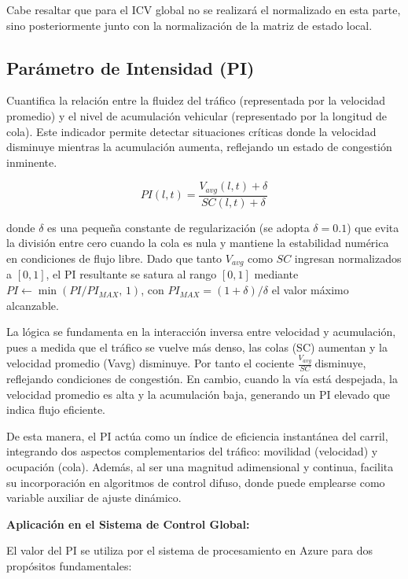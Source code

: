 \documentclass[12pt,a4paper,oneside]{report}
\begin{document}
Cabe resaltar que para el ICV global no se realizará el normalizado en esta parte, sino posteriormente junto con la normalización de la matriz de estado local.

\subsection{Parámetro de Intensidad (PI)}\label{paruxe1metro-de-intensidad-pi}

Cuantifica la relación entre la fluidez del tráfico (representada por la velocidad promedio) y el nivel de acumulación vehicular (representado por la longitud de cola). Este indicador permite detectar situaciones críticas donde la velocidad disminuye mientras la acumulación aumenta, reflejando un estado de congestión inminente.

\begin{equation}
PI(l,t) = \frac{V_{avg}(l,t) + \delta}{SC(l,t) + \delta}
\label{eq:pi}
\end{equation}

donde \(\delta\) es una pequeña constante de regularización (se adopta \(\delta = 0.1\)) que evita la división entre cero cuando la cola es nula y mantiene la estabilidad numérica en condiciones de flujo libre. Dado que tanto \(V_{avg}\) como \(SC\) ingresan normalizados a \([0,1]\), el PI resultante se satura al rango \([0,1]\) mediante \(PI \leftarrow \min(PI/PI_{MAX},\,1)\), con \(PI_{MAX} = (1+\delta)/\delta\) el valor máximo alcanzable.

La lógica se fundamenta en la interacción inversa entre velocidad y acumulación, pues a medida que el tráfico se vuelve más denso, las colas (SC) aumentan y la velocidad promedio (Vavg) disminuye. Por tanto el cociente \(\frac{V_{avg}}{SC}\ \)disminuye, reflejando condiciones de congestión. En cambio, cuando la vía está despejada, la velocidad promedio es alta y la acumulación baja, generando un PI elevado que indica flujo eficiente.

De esta manera, el PI actúa como un índice de eficiencia instantánea del carril, integrando dos aspectos complementarios del tráfico: movilidad (velocidad) y ocupación (cola). Además, al ser una magnitud adimensional y continua, facilita su incorporación en algoritmos de control difuso, donde puede emplearse como variable auxiliar de ajuste dinámico.

\textbf{Aplicación en el Sistema de Control Global:}

El valor del PI se utiliza por el sistema de procesamiento en Azure para dos propósitos fundamentales:
\end{document}
